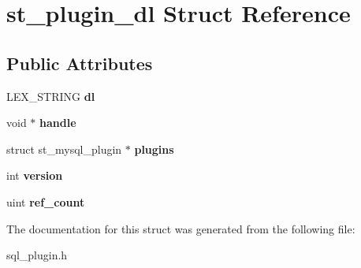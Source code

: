 \hypertarget{structst__plugin__dl}{}\section{st\+\_\+plugin\+\_\+dl Struct Reference}
\label{structst__plugin__dl}
\subsection*{Public Attributes}
\begin{DoxyCompactItemize}
\item 
\mbox{\label{structst__plugin__dl_a30b61849db28edf872b6b3d1fc030286}} 
L\+E\+X\+\_\+\+S\+T\+R\+I\+NG {\bfseries dl}
\item 
\mbox{\label{structst__plugin__dl_a7e1a7ed6ac221d3cdda61f07ff8cb93e}} 
void $\ast$ {\bfseries handle}
\item 
\mbox{\label{structst__plugin__dl_abf20e09e93de1a5118ea16d1eef69948}} 
struct st\+\_\+mysql\+\_\+plugin $\ast$ {\bfseries plugins}
\item 
\mbox{\label{structst__plugin__dl_a8603a0533eb67386fe1a6014733aaae9}} 
int {\bfseries version}
\item 
\mbox{\label{structst__plugin__dl_ae3a8c0107b38bed737e6a45cf59894c3}} 
uint {\bfseries ref\+\_\+count}
\end{DoxyCompactItemize}


The documentation for this struct was generated from the following file\+:\begin{DoxyCompactItemize}
\item 
sql\+\_\+plugin.\+h\end{DoxyCompactItemize}
